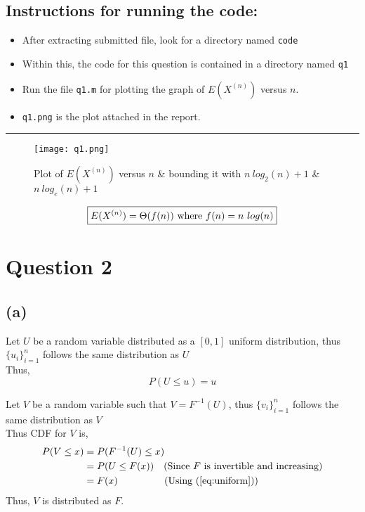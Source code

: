 \documentclass[11pt, fleqn]{article}
\begin{document}
\subsection*{Instructions for running the code:}
\begin{itemize}[itemsep=-0.6ex]
    \item After extracting submitted file, look for a directory named \texttt{code}
    \item Within this, the code for this question is contained in a directory named \texttt{q1}
    \item Run the file \texttt{q1.m} for plotting the graph of $E(X^{(n)})$ versus $n$.
    \item \texttt{q1.png} is the plot attached in the report.
\end{itemize}
\hrule
\begin{figure}[H]
    \centering
    \texttt{[image: q1.png]}
    \caption{Plot of $E(X^{(n)})$ versus $n$ \& bounding it with $n\  log_2 (n) + 1$ \& $n\ log_e (n) + 1$}
\end{figure}
\vspace{3em}
$$\boxed{E(X^{(n)}) = \Theta(f(n))$ where $f(n) = n\ log(n)}$$


\newpage
\section*{Question 2}
\setcounter{equation}{0}
\setcounter{figure}{0}

\subsection*{(a)}
Let $U$ be a random variable distributed as a $[0,1]$ uniform distribution, thus $\{u_i\}^{n}_{i=1}$ follows the same distribution as $U$\\
Thus,
\begin{equation}
    \label{eq:uniform}
     P(U \le u) = u 
\end{equation}

Let $V$ be a random variable such that $V = F^{-1}(U)$, thus $\{v_i\}^{n}_{i=1}$ follows the same distribution as $V$  \\
Thus CDF for $V$ is,
$$
\begin{aligned}
    P(V \le x) &= P(F^{-1}(U) \le x)\\
    &= P(U \le F(x)) \hspace{1em} \text{(Since $F$ is invertible and increasing)}\\
    &= F(x) \hspace{4.75em} \text{(Using (\ref{eq:uniform}))}
\end{aligned}
$$
Thus, $V$ is distributed as $F$.
\end{document}
